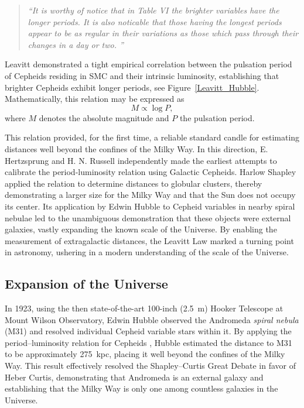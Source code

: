\begin{quote}
\textit{``It is worthy of notice that in Table VI the brighter variables have the longer periods. It is also noticable that those having the longest periods appear to be as regular in their variations as those which pass through their changes in a day or two. ''}
\end{quote}


Leavitt demonstrated a tight empirical correlation between the pulsation period of Cepheids residing in SMC and their intrinsic luminosity, establishing that brighter Cepheids exhibit longer periods, see Figure~\ref{Leavitt_Hubble}. Mathematically, this relation may be expressed as
\[
M \propto \log P,
\]
where $M$ denotes the absolute magnitude and $P$ the pulsation period.

This relation provided, for the first time, a reliable standard candle for estimating distances well beyond the confines of the Milky Way. In this direction, E. Hertzsprung \citep{hertzsprung1913} and H. N. Russell \citep{russell1913} independently made the earliest attempts to calibrate the period-luminosity relation using Galactic Cepheids. Harlow Shapley \citep{shapley1918} applied the relation to determine distances to globular clusters, thereby demonstrating a larger size for the Milky Way and that the Sun does not occupy its center. Its application by Edwin Hubble \citep{hubble1925} to Cepheid variables in nearby spiral nebulae led to the unambiguous demonstration that these objects were external galaxies, vastly expanding the known scale of the Universe. By enabling the measurement of extragalactic distances, the Leavitt Law marked a turning point in astronomy, ushering in a modern understanding of the scale of the Universe.




\subsection{Expansion of the Universe}


In 1923, using the then state-of-the-art 100-inch (2.5~m) Hooker Telescope at Mount Wilson Observatory, Edwin Hubble observed the Andromeda \textit{spiral nebula} (M31) and resolved individual Cepheid variable stars within it. By applying the period--luminosity relation for Cepheids \citep{1925hubble}, Hubble estimated the distance to M31 to be approximately 275~kpc, placing it well beyond the confines of the Milky Way. This result effectively resolved the Shapley--Curtis Great Debate in favor of Heber Curtis, demonstrating that Andromeda is an external galaxy and establishing that the Milky Way is only one among countless galaxies in the Universe.


